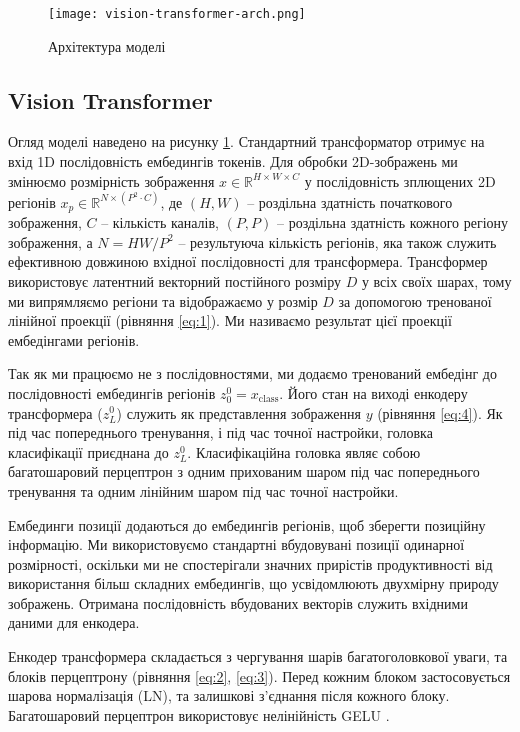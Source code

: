 \begin{figure}[H]
    \centering
    \texttt{[image: vision-transformer-arch.png]}
    \caption{Архітектура моделі}
    \label{fig:model-arch}
\end{figure}

\subsection{Vision Transformer}
Огляд моделі наведено на рисунку \ref{fig:model-arch}.
Стандартний трансформатор отримує на вхід 1D
послідовність ембедингів токенів.
Для обробки 2D-зображень ми змінюємо розмірність зображення
$x \in \mathbb{R}^{H\times W \times C}$ у послідовність
зплющених 2D регіонів $x_p \in \mathbb{R}^{N\times (P^2\cdot C)}$,
де $(H, W)$ -- роздільна здатність початкового
зображення, $C$ -- кількість каналів, $(P, P)$ -- роздільна
здатність кожного регіону зображення,
а $N = HW / P^2$ -- результуюча кількість регіонів,
яка також служить ефективною довжиною вхідної послідовності для
трансформера. Трансформер використовує
латентний векторний постійного розміру $D$ у всіх своїх шарах,
тому ми випрямляємо регіони та відображаємо у розмір $D$
за допомогою тренованої лінійної проекції (рівняння \ref{eq:1}).
Ми називаємо результат цієї проекції ембедінгами регіонів.

Так як ми працюємо не з послідовностями, ми додаємо
тренований ембедінг до послідовності ембедингів регіонів
$z_0^0 = x_{\text{class}}$. Його стан на виході енкодеру трансформера
($z_L^0$) служить як представлення зображення $y$ (рівняння \ref{eq:4}).
Як під час попереднього тренування, і під час точної настройки,
головка класифікації приєднана до  $z^0_L$.
Класифікаційна головка являє собою багатошаровий перцептрон
з одним прихованим
шаром під час попереднього тренування та одним лінійним шаром
під час точної настройки.

Ембединги позиції додаються до ембедингів регіонів,
щоб зберегти позиційну інформацію. Ми використовуємо стандартні
вбудовувані позиції одинарної розмірності, оскільки ми не
спостерігали значних прирістів продуктивності від використання
більш складних ембедингів, що усвідомлюють двухмірну природу
зображень. Отримана послідовність вбудованих векторів
служить вхідними даними для енкодера.

Енкодер трансформера складається з чергування шарів багатоголовкової
уваги, та блоків перцептрону (рівняння \ref{eq:2}, \ref{eq:3}).
Перед кожним блоком застосовується шарова нормалізація (LN),
та залишкові з'єднання після кожного блоку. Багатошаровий перцептрон
використовує нелінійність GELU \cite{gelu}.

